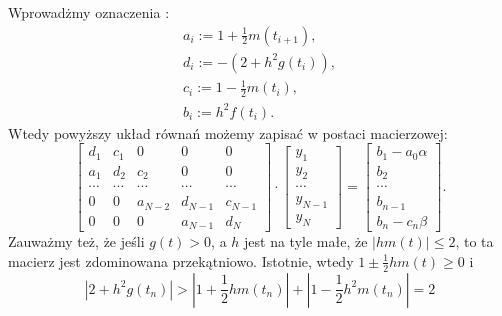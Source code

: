 Wprowadżmy oznaczenia :
\begin{align*}
a_i:= 1 + \frac{1}{2}m(t_{i+1}),\\
d_i:= -(2+h^2 g(t_i)), \\
c_i:= 1 - \frac{1}{2}m(t_i), \\
b_i:= h^2 f(t_i).
\end{align*}
Wtedy powyższy układ równań możemy zapisać w postaci macierzowej:
\begin{equation}\label{macierz}
\left[ \begin{array}{ccccc}
d_1 & c_1 & 0 & 0 & 0 \\
a_1 & d_2 & c_2 & 0 & 0\\
\cdots & \cdots & \cdots &\cdots  &\cdots \\
0 & 0 & a_{N-2} & d_{N-1} & c_{N-1}\\
0 & 0 & 0 & a_{N-1} & d_N 
\end{array} \right] \cdot
\left[ \begin{array}{c}
y_1 \\
y_2 \\
\cdots \\
y_{N-1} \\
y_{N}  
\end{array} \right] =
\left[ \begin{array}{c}
b_1 - a_0\alpha\\
b_2 \\
\cdots \\
b_{n-1} \\
b_n -c_n\beta 
\end{array} \right] .
\end{equation}
Zauważmy też, że jeśli $g(t)>0$, a $h$ jest na tyle małe, że $ |h m(t)| \leq 2$, to ta macierz jest zdominowana przekątniowo. Istotnie, wtedy $ 1 \pm \frac{1}{2}h m(t) \geq 0 $ i
$$
|2 + h^2 g(t_n)| > |1 + \frac{1}{2}h m(t_n)| + |1 - \frac{1}{2}h^2 m(t_n)| = 2
$$

